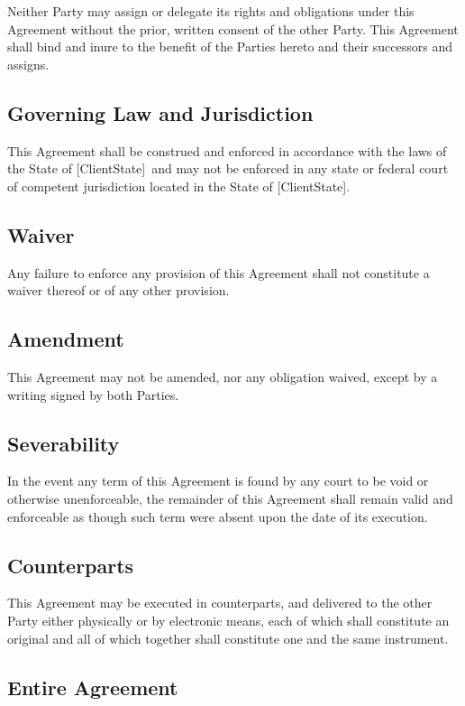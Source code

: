 \documentclass[a4paper,12pt]{article} %
\newcommand{\ClientState}{[ClientState]}
\begin{document}
Neither Party may assign or delegate its rights and obligations under this Agreement without the prior, written consent of the other Party. This Agreement shall bind and inure to the benefit of the Parties hereto and their successors and assigns.

\subsection{Governing Law and Jurisdiction}

This Agreement shall be construed and enforced in accordance with the laws of the State of \ClientState ~and may not be enforced in any state or federal court of competent jurisdiction located in the State of \ClientState.

\subsection{Waiver}

Any failure to enforce any provision of this Agreement shall not constitute a waiver thereof or of any other provision.

\subsection{Amendment}

This Agreement may not be amended, nor any obligation waived, except by a writing signed by both Parties.

\subsection{Severability}

In the event any term of this Agreement is found by any court to be void or otherwise unenforceable, the remainder of this Agreement shall remain valid and enforceable as though such term were absent upon the date of its execution.

\subsection{Counterparts}

This Agreement may be executed in counterparts, and delivered to the other Party either physically or by electronic means, each of which shall constitute an original and all of which together shall constitute one and the same instrument.

\subsection{Entire Agreement}
\end{document}
